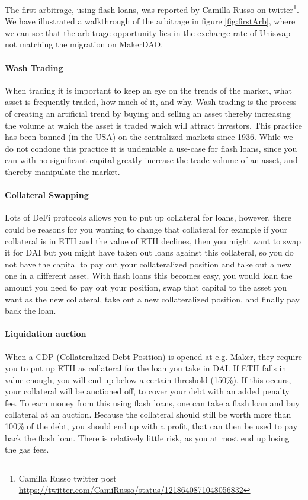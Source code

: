 The first arbitrage, using flash loans, was reported by Camilla Russo
on twitter\footnote{Camilla Russo twitter post
  \url{https://twitter.com/CamiRusso/status/1218640871048056832}}. We
have illustrated a walkthrough of the arbitrage in figure
\ref{fig:firstArb}, where we can see that the arbitrage opportunity
lies in the exchange rate of Uniswap not matching the migration on
MakerDAO.

\paragraph{Wash Trading} When trading it is important to keep an eye
on the trends of the market, what asset is frequently traded, how much
of it, and why. Wash trading is the process of creating an artificial
trend by buying and selling an asset thereby increasing the volume at
which the asset is traded which will attract investors. This practice
has been banned (in the USA) on the centralized markets since
1936. While we do not condone this practice it is undeniable a
use-case for flash loans, since you can with no significant capital greatly
increase the trade volume of an asset, and thereby manipulate the
market.

\paragraph{Collateral Swapping} Lots of DeFi protocols allows you to
put up collateral for loans, however, there could be reasons for you
wanting to change that collateral for example if your collateral is in
ETH and the value of ETH declines, then you might want to swap it for
DAI but you might have taken out loans against this collateral, so you
do not have the capital to pay out your collateralized position and
take out a new one in a different asset. With flash loans this becomes
easy, you would loan the amount you need to pay out your position, swap
that capital to the asset you want as the new collateral, take out a
new collateralized position, and finally pay back the loan.

\paragraph{Liquidation auction} When a CDP (Collateralized Debt Position) is
opened at e.g. Maker, they require you to put up ETH as collateral for the loan
you take in DAI. If ETH falls in value enough, you will end up below a certain
threshold (150\%). If this occurs, your collateral will be auctioned off, to
cover your debt with an added penalty fee. To earn money from this
using flash loans, one can take a flash loan and buy collateral at an auction.
Because the collateral should still be worth more than 100\% of the debt, you
should end up with a profit, that can then be used to pay back the flash loan.
There is relatively little risk, as you at most end up losing the gas fees.

